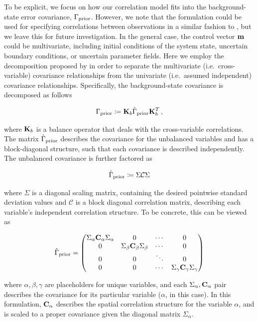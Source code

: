 To be explicit, we focus on how our correlation model fits into the
background-state error covariance, $\Gamma_{\text{prior}}$.
However, we note that the formulation could be used for specifying correlations
between observations in a similar fashion to \citet{guillet_modelling_2019}, but
we leave this for future investigation.
In the general case, the control vector $\mathbf{m}$ could be multivariate,
including initial conditions of the system state, uncertain boundary
conditions, or uncertain parameter fields.
Here we employ the decomposition proposed by
\citet{derber_reformulation_1999}
in order to separate the multivariate (i.e.\ cross-variable)
covariance relationships from the univariate (i.e.\ assumed
independent) covariance relationships.
Specifically, the background-state covariance is decomposed as follows
\begin{linenomath*}\begin{equation*}
    \Gamma_{\text{prior}} \coloneqq \mathbf{K}_{b}\hat{\Gamma}_\text{prior}\mathbf{K}_{b}^T \,
    ,
\end{equation*}\end{linenomath*}
where $\mathbf{K}_{b}$ is a balance operator that deals with the
cross-variable correlations.
The matrix $\hat{\Gamma}_\text{prior}$ describes the covariance for the unbalanced
variables and has a block-diagonal structure, such that each
covariance is described independently.
The unbalanced covariance is further factored as
\begin{linenomath*}\begin{equation*}
    \hat{\Gamma}_\text{prior} \coloneqq \Sigma \mathcal{C} \Sigma
\end{equation*}\end{linenomath*}
where $\Sigma$ is a diagonal scaling matrix, containing the desired pointwise
standard deviation values and $\mathcal{C}$ is a block diagonal correlation matrix,
describing each variable's independent correlation structure.
To be concrete, this can be viewed as
\begin{linenomath*}\begin{equation*}
    \hat{\Gamma}_\text{prior} =
    \begin{pmatrix}
        \Sigma_\alpha\mathbf{C}_\alpha\Sigma_\alpha & 0 & \cdots & 0 \\
        0 & \Sigma_\beta\mathbf{C}_\beta\Sigma_\beta & \cdots & 0 \\
        0 & 0 & \ddots & 0  \\
        0 & 0 & \cdots & \Sigma_\gamma\mathbf{C}_\gamma\Sigma_\gamma \\
    \end{pmatrix}
\end{equation*}\end{linenomath*}
where $\alpha, \beta, \gamma$ are placeholders for unique variables,
and each $\Sigma_\alpha, \mathbf{C}_\alpha$ pair describes the covariance for its
particular variable ($\alpha$, in this case).
In this formulation, $\mathbf{C}_\alpha$ describes the spatial correlation
structure for the variable $\alpha$, and is scaled to a proper covariance given the
diagonal matrix $\Sigma_\alpha$.

